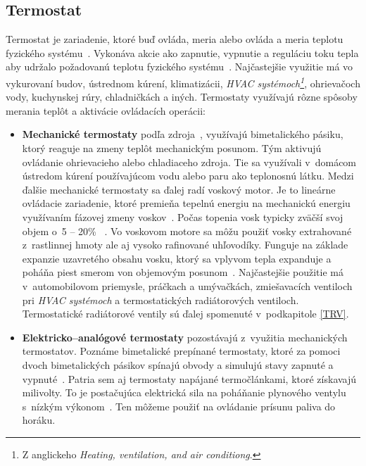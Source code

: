 \subsection{Termostat}\label{termostat}
Termostat je zariadenie, ktoré buď ovláda, meria alebo ovláda a meria teplotu fyzického systému~\cite{thermostat_definition_meaning}. 
Vykonáva akcie ako zapnutie, vypnutie a reguláciu toku tepla aby udržalo požadovanú teplotu fyzického systému~\cite{thermostat_definition_meaning}. 
Najčastejšie využitie má vo vykurovaní budov, ústrednom kúrení, klimatizácii, \emph{HVAC systémoch\footnote{Z anglickeho \emph{Heating, ventilation, and air conditiong}.}}, ohrievačoch vody, kuchynskej rúry, chladničkách a iných.
Termostaty využívajú rôzne spôsoby merania teplôt a aktivácie ovládacích operácii:
\begin{itemize}
    \item \textbf{Mechanické termostaty} podľa zdroja~\cite{w_2021}, využívajú bimetalického pásiku, ktorý reaguje na zmeny teplôt mechanickým posunom. 
    Tým aktivujú ovládanie ohrievacieho alebo chladiaceho zdroja. 
    Tie sa využívali v~domácom ústredom kúrení používajúcom vodu alebo paru ako teplonosnú látku. 
    Medzi ďalšie mechanické termostaty sa ďalej radí voskový motor. 
    Je to lineárne ovládacie zariadenie, ktoré premieňa tepelnú energiu na mechanickú energiu využívaním fázovej zmeny voskov~\cite{ward1976anatomy}. 
    Počas topenia vosk typicky zväčší svoj objem o~5 – 20\% ~\cite{mozes1983paraffin}. 
    Vo voskovom motore sa môžu použiť vosky extrahované z~rastlinnej hmoty ale aj vysoko rafinované uhľovodíky. 
    Funguje na základe expanzie uzavretého obsahu vosku, ktorý sa vplyvom tepla expanduje a poháňa piest smerom von objemovým posunom~\cite{cdn_2020}. 
    Najčastejšie použitie má v~automobilovom priemysle, práčkach a umývačkách, zmiešavacích ventiloch pri \emph{HVAC systémoch} a termostatických radiátorových ventiloch. 
    Termostatické radiátorové ventily sú ďalej spomenuté v~podkapitole \ref{TRV}.
    \item \textbf{Elektricko–analógové termostaty} pozostávajú z~využitia mechanických termostatov. 
    Poznáme bimetalické prepínané termostaty, ktoré za pomoci dvoch bimetalických pásikov spínajú obvody a simulujú stavy zapnuté a vypnuté~\cite{w_2021}. 
    Patria sem aj termostaty napájané termočlánkami, ktoré získavajú milivolty. 
    To je postačujúca elektrická sila na poháňanie plynového ventylu s~nízkým výkonom~\cite{formisano_2022}. 
    Ten môžeme použiť na ovládanie prísunu paliva do horáku.
    

\end{itemize}

